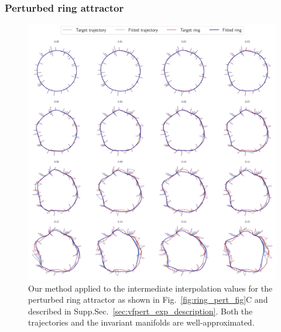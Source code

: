 \documentclass{article}
\theoremstyle{definition} \newtheorem{definition}{Definition}  \newtheorem{example}{Example}
\theoremstyle{remark} \newtheorem{remark}{Remark}
\newcounter{ct}
\begin{document}
\subsubsection{Perturbed ring attractor}
\begin{figure}[htbp]
    \centering
    \includegraphics[width=\linewidth]{perturbed_both_trajectories_asy}
    \caption{Our method applied to the intermediate interpolation values for the perturbed ring attractor as shown in Fig.~\ref{fig:ring_pert_fig}C and described in 
	Supp.Sec.~\ref{sec:vfpert_exp_description}.
	Both the trajectories and the invariant manifolds are well-approximated.
     }
    \label{fig:perturbed_both_trajectories_asy}
\end{figure}
\end{document}
